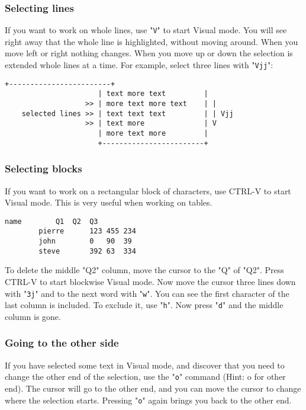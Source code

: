 \subsubsection{Selecting lines}

If you want to work on whole lines, use "\verb!V!" to start Visual mode.
You will see right away that the whole line is highlighted, without moving around.
When you move left or right nothing changes.
When you move up or down the selection is extended whole lines at a time.
For example, select three lines with "\verb!Vjj!":

\begin{Verbatim}[samepage=true]
                      +------------------------+
                      | text more text         |
                   >> | more text more text    | |
    selected lines >> | text text text         | | Vjj
                   >> | text more              | V
                      | more text more         |
                      +------------------------+
\end{Verbatim}

\subsubsection{Selecting blocks}

If you want to work on a rectangular block of characters, use CTRL-V to start
Visual mode.  This is very useful when working on tables.
\begin{Verbatim}[samepage=true]
        name        Q1  Q2  Q3
        pierre      123 455 234
        john        0   90  39
        steve       392 63  334
\end{Verbatim}

To delete the middle "Q2" column, move the cursor to the "Q" of "Q2".
Press CTRL-V to start blockwise Visual mode.
Now move the cursor three lines down with "\verb!3j!" and to the next word with "\verb!w!".
You can see the first character of the last column is included.
To exclude it, use "\verb!h!".
Now press "\verb!d!" and the middle column is gone.

\subsubsection{Going to the other side}

If you have selected some text in Visual mode, and discover that you need to change the other end of the selection, use the "\verb!o!" command (Hint: o for other end).
The cursor will go to the other end, and you can move the cursor to change where the selection starts.
Pressing "\verb!o!" again brings you back to the other end.

